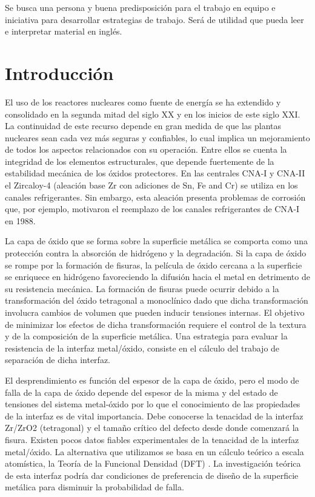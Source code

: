 Se busca una persona y buena predisposición para el trabajo
en equipo e iniciativa para desarrollar estrategias de 
trabajo. Será de utilidad que pueda leer e interpretar
material en inglés.  

\section{Introducción }

El uso de los reactores nucleares como fuente de energía se ha extendido y 
consolidado en la segunda mitad del siglo XX y en los inicios de este siglo 
XXI. La continuidad de este recurso depende en gran medida de que las plantas 
nucleares sean cada vez más seguras y confiables, lo cual implica un 
mejoramiento de todos los aspectos relacionados con su operación. Entre ellos 
se cuenta la integridad de los elementos estructurales, que depende fuertemente 
de la estabilidad mecánica de los óxidos protectores. En las centrales CNA-I y 
CNA-II el Zircaloy-4 (aleación base Zr con adiciones de Sn, Fe and Cr) se 
utiliza en los canales refrigerantes\cite{Estevez2000}. Sin embargo, esta 
aleación presenta 
problemas de corrosión que, por ejemplo, motivaron el reemplazo de los canales 
refrigerantes de CNA-I en 1988.

La capa de óxido que se forma sobre la superficie metálica se comporta como una 
protección contra la absorción de hidrógeno y la degradación. Si la capa de 
óxido se rompe por la formación de fisuras, la película de óxido cercana a la 
superficie se enriquece en hidrógeno favoreciendo la difusión hacia el metal en 
detrimento de su resistencia mecánica. La formación de fisuras puede ocurrir 
debido a la transformación del óxido tetragonal a monoclínico dado que dicha 
transformación involucra cambios de volumen que pueden inducir tensiones 
internas. El objetivo de minimizar los efectos de dicha transformación requiere 
el control de la textura y de la composición de la superficie metálica. Una 
estrategia para evaluar la resistencia de la interfaz metal/óxido, consiste en 
el cálculo del trabajo de separación de dicha interfaz.

El desprendimiento es función del espesor de la capa de óxido\cite{Schutze2005},
pero el modo 
de falla de la capa de óxido depende del espesor de la misma y del estado de 
tensiones del sistema metal-óxido por lo que el conocimiento de las propiedades 
de la interfaz es de vital importancia. Debe conocerse la tenacidad de la 
interfaz Zr/ZrO2 (tetragonal) y el tamaño crítico del defecto desde donde 
comenzará la fisura. Existen pocos datos fiables experimentales de la tenacidad 
de la interfaz metal/óxido. La alternativa que utilizamos se basa en un cálculo 
teórico a escala atomística, la Teoría de la Funcional Densidad (DFT) 
\cite{KohnSham65,HohenbergKohn64}. La 
investigación teórica de esta interfaz podría dar condiciones de preferencia de 
diseño de la superficie metálica para disminuir la probabilidad de falla.


